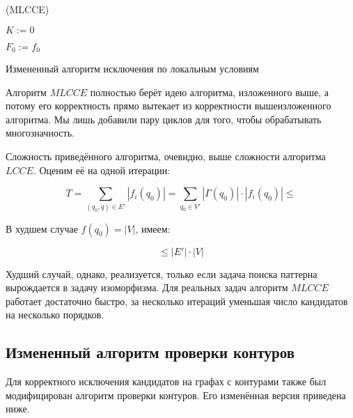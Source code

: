 \begin{algorithm}[H]
	\Large
	\Begin(MLCCE){
		$K := 0$
		
		$F_0 := f_0$
		
	}
	
	\caption{Измененный алгоритм исключения по локальным условиям}
	\label{alg:MLCCE}
\end{algorithm}

Алгоритм $MLCCE$ полностью берёт идею алгоритма, изложенного выше, а потому его корректность прямо вытекает из корректности вышеизложенного алгоритма. Мы лишь добавили пару циклов для того, чтобы обрабатывать многозначность.

Сложность приведённого алгоритма, очевидно, выше сложности алгоритма $LCCE$. Оценим её на одной итерации:

\[T = \sum\limits_{(q_0, q) \in E'}  |f_i(q_0)| = \sum\limits_{q_0 \in V'}  |\Gamma(q_0)|\cdot|f_i(q_0)| \le \]

В худшем случае $f(q_0) = |V|$, имеем:

\[ \le |E'|\cdot|V| \]

Худший случай, однако, реализуется, только если задача поиска паттерна вырождается в задачу изоморфизма. Для реальных задач алгоритм $MLCCE$ работает достаточно быстро, за несколько итераций уменьшая число кандидатов на несколько порядков.

\subsection{Измененный алгоритм проверки контуров}

Для корректного исключения кандидатов на графах с контурами также был модифицирован алгоритм проверки контуров. Его изменённая версия приведена ниже.

